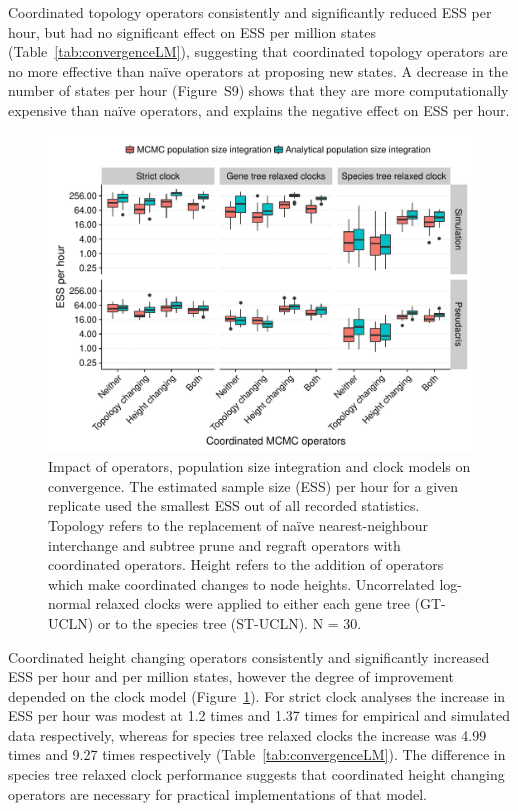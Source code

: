 \documentclass[12pt]{article}
\begin{document}
Coordinated topology operators consistently and significantly reduced ESS
per hour, but had no significant effect on ESS per million states
(Table~\ref{tab:convergenceLM}), suggesting that coordinated topology
operators are no more effective than na\"ive operators at proposing new
states. A decrease in the number of states per hour (Figure~S9) shows that
they are more computationally expensive than na\"ive operators, and explains
the negative effect on ESS per hour.

\begin{figure}[htb!]
\centering
\includegraphics[width=130mm]{minimum-ess_per_hour-starbeast2.pdf}
\caption
{Impact of operators, population size integration and clock models on
convergence. The estimated sample size (ESS) per hour for a given replicate
used the smallest ESS out of all recorded statistics. Topology refers to the
replacement of na\"ive nearest-neighbour interchange and subtree prune and
regraft operators with coordinated operators. Height refers to the addition of
operators which make coordinated changes to node heights. Uncorrelated log-normal relaxed clocks were applied to either each gene tree (GT-UCLN) or to
the species tree (ST-UCLN). N = 30.}
\label{fig:realEssPerHour}
\end{figure}

Coordinated height changing operators consistently and significantly
increased ESS per hour and per million states, however the degree of
improvement depended on the clock model (Figure~\ref{fig:realEssPerHour}). For
strict clock analyses the increase in ESS per hour was modest at 1.2 times and
1.37 times for empirical and simulated data respectively, whereas for species
tree relaxed clocks the increase was 4.99 times and 9.27 times respectively
(Table~\ref{tab:convergenceLM}). The difference in species tree relaxed clock
performance suggests that coordinated height changing operators are necessary
for practical implementations of that model.
\end{document}
